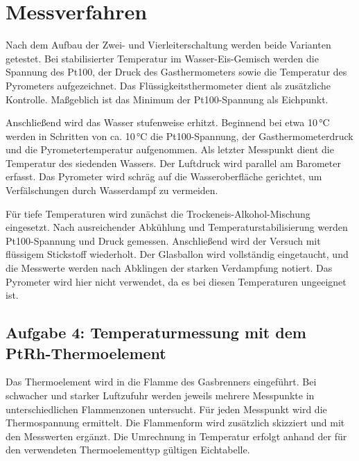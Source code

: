 \section{Messverfahren}

Nach dem Aufbau der Zwei- und Vierleiterschaltung werden beide Varianten getestet. Bei stabilisierter Temperatur im Wasser-Eis-Gemisch werden die Spannung des Pt100, der Druck des Gasthermometers sowie die Temperatur des Pyrometers aufgezeichnet. Das Flüssigkeitsthermometer dient als zusätzliche Kontrolle. Maßgeblich ist das Minimum der Pt100-Spannung als Eichpunkt.

Anschließend wird das Wasser stufenweise erhitzt. Beginnend bei etwa 10\,°C werden in Schritten von ca. 10\,°C die Pt100-Spannung, der Gasthermometerdruck und die Pyrometertemperatur aufgenommen. Als letzter Messpunkt dient die Temperatur des siedenden Wassers. Der Luftdruck wird parallel am Barometer erfasst. Das Pyrometer wird schräg auf die Wasseroberfläche gerichtet, um Verfälschungen durch Wasserdampf zu vermeiden.

Für tiefe Temperaturen wird zunächst die Trockeneis-Alkohol-Mischung eingesetzt. Nach ausreichender Abkühlung und Temperaturstabilisierung werden Pt100-Spannung und Druck gemessen. Anschließend wird der Versuch mit flüssigem Stickstoff wiederholt. Der Glasballon wird vollständig eingetaucht, und die Messwerte werden nach Abklingen der starken Verdampfung notiert. Das Pyrometer wird hier nicht verwendet, da es bei diesen Temperaturen ungeeignet ist.

\subsection*{Aufgabe 4: Temperaturmessung mit dem PtRh-Thermoelement}
Das Thermoelement wird in die Flamme des Gasbrenners eingeführt. Bei schwacher und starker Luftzufuhr werden jeweils mehrere Messpunkte in unterschiedlichen Flammenzonen untersucht. Für jeden Messpunkt wird die Thermospannung ermittelt. Die Flammenform wird zusätzlich skizziert und mit den Messwerten ergänzt. Die Umrechnung in Temperatur erfolgt anhand der für den verwendeten Thermoelementtyp gültigen Eichtabelle.
